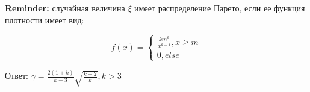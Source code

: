 \documentclass[12pt]{article}
\newenvironment{solution}{}{}
\begin{document}
\begin{enumerate}
    \textbf{Reminder:} случайная величина $\xi$ имеет распределение Парето, если ее функция плотности имеет вид:
    
    $$f(x) =
    \begin{cases}
    \frac{km^k}{x^{k+1}}, x \geq m \\
    0, else
    \end{cases}$$    
    
\begin{solution}
    Ответ: $\gamma=\frac{2(1+k)}{k-3}\sqrt{\frac{k-2}{k}}, k > 3$
\end{solution}

\end{enumerate}

\end{document}
